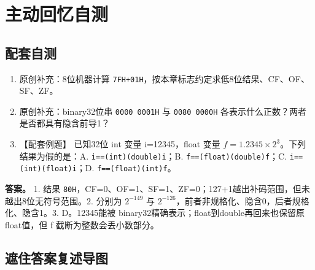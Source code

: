 \section{主动回忆自测}\label{CO02-recall}

\subsection{配套自测}\label{CO02-27}

\begin{enumerate}
\def\labelenumi{\arabic{enumi}.}
\tightlist
\item
  原创补充：8位机器计算 \texttt{7FH+\allowbreak{}01H}，按本章标志约定求低8位结果、CF、OF、SF、ZF。
\item
  原创补充：binary32位串 \texttt{0000 0001H} 与 \texttt{0080 0000H} 各表示什么正数？两者是否都具有隐含前导1？
\item
  【配套例题】 已知32位 int 变量 i=12345，float 变量 \(f=1.2345\times2^3\)。下列结果为假的是：A. \texttt{i=\allowbreak{}=\allowbreak{}(\allowbreak{}int)\allowbreak{}(\allowbreak{}double)\allowbreak{}i}；B. \texttt{f=\allowbreak{}=\allowbreak{}(\allowbreak{}float)\allowbreak{}(\allowbreak{}double)\allowbreak{}f}；C. \texttt{i=\allowbreak{}=\allowbreak{}(\allowbreak{}int)\allowbreak{}(\allowbreak{}float)\allowbreak{}i}；D. \texttt{f=\allowbreak{}=\allowbreak{}(\allowbreak{}float)\allowbreak{}(\allowbreak{}int)\allowbreak{}f}。
\end{enumerate}

\textbf{答案。} 1. 结果 \texttt{80H}，CF=0、OF=1、SF=1、ZF=0；127+1越出补码范围，但未越出8位无符号范围。2. 分别为 \(2^{-149}\) 与 \(2^{-126}\)，前者非规格化、隐含0，后者规格化、隐含1。3. D。12345能被 binary32精确表示；float到double再回来也保留原float值，但 f 截断为整数会丢小数部分。

\subsection{遮住答案复述导图}\label{CO02-recall-new}

